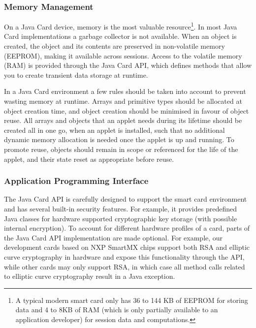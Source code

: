 \subsubsection{Memory Management}

On a Java Card device, memory is the most valuable resource\footnote{A typical 
modern smart card only has 36 to 144 KB of EEPROM for storing data and 4 to 8KB
of RAM (which is only partially available to an application developer) for
session data and computations.}. In most Java Card implementations a garbage
collector is not available. When an object is created, the object and its
contents are preserved in non-volatile 
memory (EEPROM), making it available 
across sessions. Access to the volatile memory 
(RAM) is provided through the Java Card API, which defines methods 
that allow you to create transient data storage at runtime.

In a Java Card environment a few rules should be taken into account to prevent
wasting memory at runtime. Arrays and primitive types should be allocated at
object creation time, and object creation should be minimised in favour of
object reuse. All arrays and objects that an applet needs during its lifetime 
should be created all in one go, when an applet is installed, such that no 
additional dynamic memory allocation is needed once the applet is up and 
running. To promote reuse, objects should remain in scope or referenced for the
life of the applet, and their state reset as appropriate before reuse.

\subsubsection{Application Programming Interface}

The Java Card API is carefully designed to support the
smart card environment and has several built-in security features. For example,
it provides predefined Java classes for hardware supported cryptographic key
storage (with possible internal encryption). To account for different hardware
profiles of a card, parts of the Java Card API implementation are made optional.
For example, our development cards based on NXP SmartMX chips support both RSA
 and elliptic curve cryptography in hardware and expose this functionality through the API, while
other cards may only support RSA, in which case all method calls related to
elliptic curve cryptography result in a Java exception.

